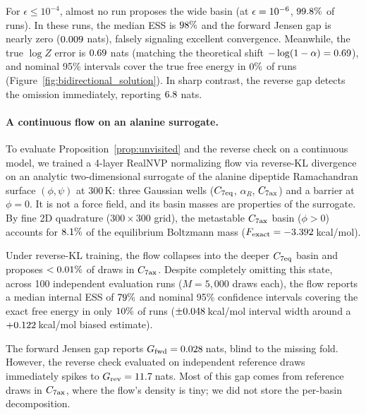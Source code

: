 For $\epsilon\le10^{-4}$, almost no run proposes the wide basin (at $\epsilon=10^{-6}$, $99.8\%$ of runs). In these runs, the median ESS is $98\%$ and the forward Jensen gap is nearly zero ($0.009$ nats), falsely signaling excellent convergence. Meanwhile, the true $\log Z$ error is $0.69$ nats (matching the theoretical shift $-\log(1-\alpha)=0.69$), and nominal 95\% intervals cover the true free energy in $0\%$ of runs (Figure~\ref{fig:bidirectional_solution}). In sharp contrast, the reverse gap detects the omission immediately, reporting $6.8$ nats.

\paragraph{A continuous flow on an alanine surrogate.}
To evaluate Proposition~\ref{prop:unvisited} and the reverse check on a continuous model, we trained a 4-layer RealNVP normalizing flow \citep{noe2019boltzmann} via reverse-KL divergence on an analytic two-dimensional surrogate of the alanine dipeptide Ramachandran surface $(\phi, \psi)$ at 300\,K: three Gaussian wells ($C_{7\rm eq}$, $\alpha_R$, $C_{7\rm ax}$) and a barrier at $\phi=0$. It is not a force field, and its basin masses are properties of the surrogate. By fine 2D quadrature ($300\times300$ grid), the metastable $C_{7\rm ax}$ basin ($\phi > 0$) accounts for $8.1\%$ of the equilibrium Boltzmann mass ($F_{\rm exact} = -3.392$\,kcal/mol). 

Under reverse-KL training, the flow collapses into the deeper $C_{7\rm eq}$ basin and proposes $<0.01\%$ of draws in $C_{7\rm ax}$. Despite completely omitting this state, across 100 independent evaluation runs ($M=5{,}000$ draws each), the flow reports a median internal ESS of $79\%$ and nominal 95\% confidence intervals covering the exact free energy in only $10\%$ of runs ($\pm0.048$\,kcal/mol interval width around a $+0.122$\,kcal/mol biased estimate). 

The forward Jensen gap reports $G_{\rm fwd} = 0.028$\,nats, blind to the missing fold. However, the reverse check evaluated on independent reference draws immediately spikes to $G_{\rm rev} = 11.7$\,nats. Most of this gap comes from reference draws in $C_{7\rm ax}$, where the flow's density is tiny; we did not store the per-basin decomposition.

